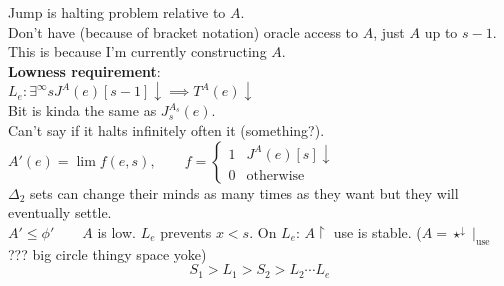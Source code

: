 \documentclass{article}
\let\ddd\cdots
\newcommand{\halts}{\downarrow}
\theoremstyle{definition}
\theoremstyle{remark}
\theoremstyle{example}
\begin{document}
	Jump is halting problem relative to $A$.\\
	Don't have (because of bracket notation) oracle access to $A$, just $A$ up to $s-1$. This is because I'm currently constructing $A$.\\
	\textbf{Lowness requirement}:\\
	$L_e:\exists^\infty sJ^A(e)[s-1]\halts \implies T^A(e)\halts$\\
	Bit is kinda the same as $J_s^{A_s}(e)$.\\
	Can't say if it halts infinitely often it (something?).\\
	$A'(e)=\lim f(e,s),\qquad f= \begin{cases}
			1 & J^A(e)[s]\halts\\
			0 & \mathrm{otherwise}
	\end{cases}$\\
	$\Delta_2$ sets can change their minds as many times as they want but they will eventually settle.\\
	$A' \leq \phi'\qquad A$ is low. $L_e$ prevents $x < s$.
	On $L_e$: $A \upharpoonright$ use is stable. ($A=\star^\downarrow \mid_\mathrm{use}$??? big circle thingy space yoke)
	\[S_1 > L_1 > S_2 > L_2 \ddd L_e\]
\end{document}
